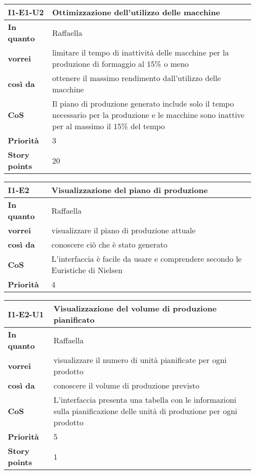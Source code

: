 \begin{table}[H]
  \begin{tabularx}{\textwidth}{lX}
    \toprule
    \textbf{I1-E1-U2} & \textbf{Ottimizzazione dell'utilizzo delle macchine} \\
    \midrule
    \textbf{In quanto} & Raffaella \\
    \textbf{vorrei} & limitare il tempo di inattività delle macchine per la produzione di formaggio al 15\% o meno \\
    \textbf{così da} & ottenere il massimo rendimento dall'utilizzo delle macchine \\
    \midrule
    \textbf{CoS} & Il piano di produzione generato include solo il tempo necessario per la produzione e le macchine sono inattive per al massimo il 15\% del tempo \\
    \midrule
    \textbf{Priorità} & 3 \\
    \textbf{Story points} & 20 \\
    \bottomrule
  \end{tabularx}
  \label{user-story:i1-e1-u2}
\end{table}

\begin{table}[H]
  \begin{tabularx}{\textwidth}{lX}
    \toprule
    \textbf{I1-E2} & \textbf{Visualizzazione del piano di produzione} \\
    \midrule
    \textbf{In quanto} & Raffaella \\
    \textbf{vorrei} & visualizzare il piano di produzione attuale \\
    \textbf{così da} & conoscere ciò che è stato generato \\
    \midrule
    \textbf{CoS} & L'interfaccia è facile da usare e comprendere secondo le Euristiche di Nielsen~\cite{cit:nielsen} \\
    \midrule
    \textbf{Priorità} & 4 \\
    \bottomrule
  \end{tabularx}
  \label{user-story:i1-e2}
\end{table}

\begin{table}[H]
  \begin{tabularx}{\textwidth}{lX}
    \toprule
    \textbf{I1-E2-U1} & \textbf{Visualizzazione del volume di produzione pianificato} \\
    \midrule
    \textbf{In quanto} & Raffaella \\
    \textbf{vorrei} & visualizzare il numero di unità pianificate per ogni prodotto \\
    \textbf{così da} & conoscere il volume di produzione previsto \\
    \midrule
    \textbf{CoS} & L'interfaccia presenta una tabella con le informazioni sulla pianificazione delle unità di produzione per ogni prodotto \\
    \midrule
    \textbf{Priorità} & 5 \\
    \textbf{Story points} & 1 \\
    \bottomrule
  \end{tabularx}
  \label{user-story:i1-e2-u1}
\end{table}

